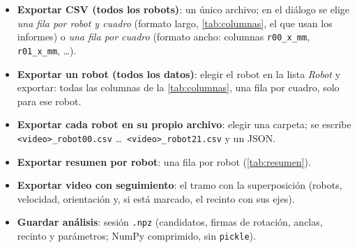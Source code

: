 \begin{itemize}
  \item \textbf{Exportar CSV (todos los robots)}: un único archivo; en el diálogo se elige \emph{una fila
        por robot y cuadro} (formato largo, \cref{tab:columnas}, el que usan los informes) o \emph{una fila
        por cuadro} (formato ancho: columnas \texttt{r00\_x\_mm}, \texttt{r01\_x\_mm}, \ldots).
  \item \textbf{Exportar un robot (todos los datos)}: elegir el robot en la lista \emph{Robot} y
        exportar: todas las columnas de la \cref{tab:columnas}, una fila por cuadro, solo para ese robot.
  \item \textbf{Exportar cada robot en su propio archivo}: elegir una carpeta; se escribe
        \texttt{<video>\_robot00.csv} \ldots\ \texttt{<video>\_robot21.csv} y un JSON.
  \item \textbf{Exportar resumen por robot}: una fila por robot (\cref{tab:resumen}).
  \item \textbf{Exportar video con seguimiento}: el tramo con la superposición (robots, velocidad,
        orientación y, si está marcado, el recinto con sus ejes).
  \item \textbf{Guardar análisis}: sesión \texttt{.npz} (candidatos, firmas de rotación, anclas, recinto y
        parámetros; NumPy comprimido, sin \texttt{pickle}).
\end{itemize}

